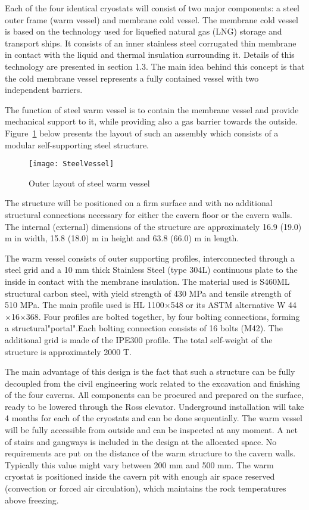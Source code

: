 Each of the four identical cryostats will consist of two 
major components: a steel outer frame (warm vessel) and 
membrane cold vessel. The membrane cold vessel is based 
on the technology used for liquefied natural gas (LNG) 
storage and transport ships. It consists of an inner 
stainless steel corrugated thin membrane in contact with 
the liquid and thermal insulation surrounding it. Details 
of this technology are presented in section 1.3. The main 
idea behind this concept is that the cold membrane vessel 
represents a fully contained vessel with two independent 
barriers.

The function of steel warm vessel is to contain the membrane 
vessel and provide mechanical support to it, while providing 
also a gas barrier towards the outside. Figure~\ref{fig:SteelVessel} 
below presents the layout of such an assembly which consists
of a modular self-supporting steel structure.

\begin{figure}[htbp]
\centering
\texttt{[image: SteelVessel]}
\caption[Outer layout of steel warm vessel]{Outer layout of steel warm vessel}
\label{fig:SteelVessel}
\end{figure}

The structure will be positioned on a firm surface and with 
no additional structural connections necessary for either 
the cavern floor or the cavern walls. The internal (external) 
dimensions of the structure are approximately 16.9 (19.0) m 
in width, 15.8 (18.0) m in height and 63.8 (66.0) m in length.

The warm vessel consists of outer supporting profiles, interconnected 
through a steel grid and a 10 mm thick Stainless Steel (type 304L) 
continuous plate to the inside in contact with the membrane insulation.
The material used is S460ML structural carbon steel, with yield 
strength of 430 MPa and tensile strength of 510 MPa. The main 
profile used is HL 1100$\times$548 or its ASTM alternative W 44
$\times$16$\times$368. Four profiles are bolted together, by 
four bolting connections, forming a structural"portal".Each 
bolting connection consists of 16 bolts (M42). The additional 
grid is made of the IPE300 profile. The total self-weight of 
the structure is approximately 2000 T.

The main advantage of this design is the fact that such a structure 
can be fully decoupled from the civil engineering work related to
the excavation and finishing of the four caverns. All components 
can be procured and prepared on the surface, ready to be lowered 
through the Ross elevator. Underground installation will take 4 
months for each of the cryostats and can be done sequentially.  
The warm vessel will be fully accessible from outside and can be 
inspected at any moment. A net of stairs and gangways is included 
in the design at the allocated space. No requirements are put on 
the distance of the warm structure to the cavern walls. Typically
 this value might vary between 200 mm and 500 mm. The warm cryostat 
is positioned inside the cavern pit with enough air space 
reserved (convection or forced air circulation), which maintains 
the rock temperatures above freezing.

